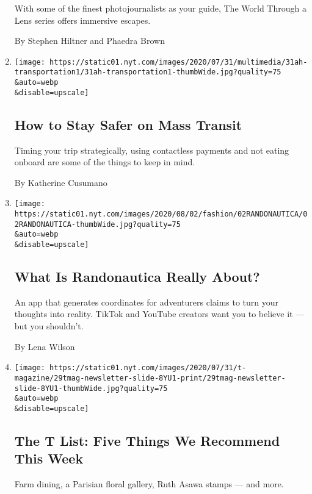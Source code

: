 \begin{enumerate}
  With some of the finest photojournalists as your guide, The World
  Through a Lens series offers immersive escapes.

  By Stephen Hiltner and Phaedra Brown
\item
  \href{/2020/08/01/at-home/coronavirus-public-transportation-subway.html}{}

  \texttt{[image: https://static01.nyt.com/images/2020/07/31/multimedia/31ah-transportation1/31ah-transportation1-thumbWide.jpg?quality=75\\\&auto=webp\\\&disable=upscale]}

  \hypertarget{how-to-stay-safer-on-mass-transit}{%
  \subsection{How to Stay Safer on Mass
  Transit}\label{how-to-stay-safer-on-mass-transit}}

  Timing your trip strategically, using contactless payments and not
  eating onboard are some of the things to keep in mind.

  By Katherine Cusumano
\item
  \href{/2020/07/31/style/randonautica-app.html}{}

  \texttt{[image: https://static01.nyt.com/images/2020/08/02/fashion/02RANDONAUTICA/02RANDONAUTICA-thumbWide.jpg?quality=75\\\&auto=webp\\\&disable=upscale]}

  \hypertarget{what-is-randonautica-really-about}{%
  \subsection{What Is Randonautica Really
  About?}\label{what-is-randonautica-really-about}}

  An app that generates coordinates for adventurers claims to turn your
  thoughts into reality. TikTok and YouTube creators want you to believe
  it --- but you shouldn't.

  By Lena Wilson
\item
  \href{/2020/07/30/t-magazine/the-t-list-five-things-we-recommend-this-week.html}{}

  \texttt{[image: https://static01.nyt.com/images/2020/07/31/t-magazine/29tmag-newsletter-slide-8YU1-print/29tmag-newsletter-slide-8YU1-thumbWide.jpg?quality=75\\\&auto=webp\\\&disable=upscale]}

  \hypertarget{the-t-list-five-things-we-recommend-this-week}{%
  \subsection{The T List: Five Things We Recommend This
  Week}\label{the-t-list-five-things-we-recommend-this-week}}

  Farm dining, a Parisian floral gallery, Ruth Asawa stamps --- and
  more.
\end{enumerate}

